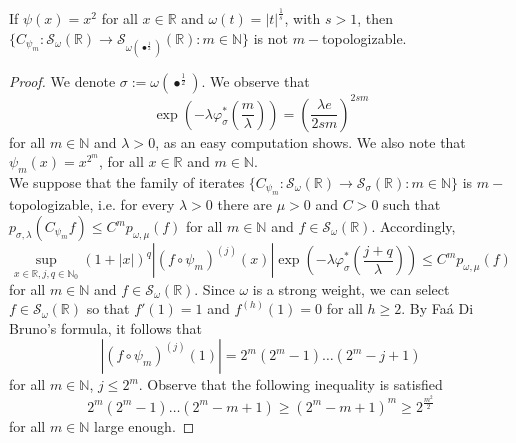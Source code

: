 \documentclass[10pt,a4paper]{amsart}
\begin{document}
\begin{prop}\label{squaremtop}
If $\psi(x)=x^2$ for all $x\in\mathbb{R}$ and $\omega(t)=|t|^{\frac{1}{s}}$, with $s>1$, then $\{C_{\psi_m}:\mathcal{S}_{\omega}(\mathbb{R})\to \mathcal{S}_{\omega(\bullet^{\frac{1}{2}})}(\mathbb{R}):m\in\mathbb{N}\}$ is not $m-$topologizable.
\end{prop}

\begin{proof}
We denote $\sigma:=\omega(\bullet^{\frac{1}{2}})$. We observe that 
\begin{equation*}
	\exp\left(-\lambda \varphi^*_\sigma\left(\frac{m}{\lambda}\right)\right)=\left(\frac{\lambda e}{2s m}\right)^{2s m}
\end{equation*} 
for all $m\in\mathbb{N}$ and $\lambda>0$, as  an easy computation shows.
We also  note that $\psi_m(x)=x^{2^m}$, for all $x\in\mathbb{R}$ and $m\in\mathbb{N}$.\\

We  suppose that the family of iterates $\{C_{\psi_m}:\mathcal{S}_{\omega}(\mathbb{R})\to \mathcal{S}_{\sigma}(\mathbb{R}):m\in\mathbb{N}\}$ is $m-$topologizable, i.e. for every $\lambda>0$ there are $\mu>0$ and $C>0$ such that $p_{\sigma,\lambda}(C_{\psi_m}f)\leq C^mp_{\omega,\mu}(f)$ for all $m\in\mathbb{N}$ and  $f\in \mathcal{S}_{\omega}(\mathbb{R})$. Accordingly, 
\begin{equation}\label{redabssquare}
	\sup_{x\in\mathbb{R}, j, q\in\mathbb{N}_0} (1+|x|)^q  |(f\circ \psi_m)^{(j)}(x)|  \exp\left(-\lambda \varphi^*_\sigma\left(\frac{j+q}{\lambda}\right)\right) \leq C^m  p_{\omega,\mu}(f)
\end{equation} 
for all $m\in\mathbb{N}$ and  $f\in \mathcal{S}_{\omega}(\mathbb{R})$. Since $\omega$ is a strong weight, we can select $f\in \mathcal{S}_{\omega}(\mathbb{R})$ so that $f'(1)=1$ and $f^{(h)}(1)=0$ for all $h\geq 2$. 
By Fa\'a Di Bruno's formula, it follows that 
\begin{equation*}
	|(f\circ\psi_m)^{(j)}(1)|=2^m (2^m-1) \ldots (2^m-j+1)
\end{equation*} 
for all $m\in\mathbb{N}$, $j\leq 2^m$. Observe that  the following inequality is satisfied 
\begin{equation*}
	2^m (2^m-1) \ldots (2^m-m+1)\geq (2^m-m+1)^m \geq 2^{\frac{m^2}{2}}
\end{equation*} 
for all $m\in\mathbb{N}$ large enough.


\end{proof}
\end{document}
